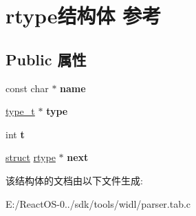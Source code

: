 \hypertarget{structrtype}{}\section{rtype结构体 参考}
\label{structrtype}
\subsection*{Public 属性}
\begin{DoxyCompactItemize}
\item 
\mbox{\label{structrtype_aad8ce7785be0ada91e93b7bb16db9978}} 
const char $\ast$ {\bfseries name}
\item 
\mbox{\label{structrtype_ab46a1fdabbb6b78def50eab6bd3e0646}} 
\hyperlink{struct__type__t}{type\+\_\+t} $\ast$ {\bfseries type}
\item 
\mbox{\label{structrtype_a6711322ecb5b4e8262fdcf5cfd5d4b01}} 
int {\bfseries t}
\item 
\mbox{\label{structrtype_a775ef6a67e6fb6815c5083c7268aa69e}} 
\hyperlink{interfacestruct}{struct} \hyperlink{structrtype}{rtype} $\ast$ {\bfseries next}
\end{DoxyCompactItemize}


该结构体的文档由以下文件生成\+:\begin{DoxyCompactItemize}
\item 
E\+:/\+React\+O\+S-\/0../sdk/tools/widl/parser.\+tab.\+c\end{DoxyCompactItemize}
